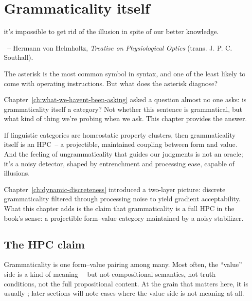 \chapter{Grammaticality itself}
\label{ch:grammaticality-itself}
\epigraph{it's impossible to get rid of the illusion in spite of our better knowledge.}{~-- Hermann von Helmholtz, \textit{Treatise on Physiological Optics} (trans. J. P. C. Southall).}

The asterisk is the most common symbol in syntax, and one of the least likely to come with operating instructions. But what does the asterisk diagnose?

Chapter~\ref{ch:what-we-havent-been-asking} asked a question almost no one asks: is grammaticality itself a category? Not whether this sentence is grammatical, but what kind of thing we're probing when we ask. This chapter provides the answer.

If linguistic categories are homeostatic property clusters, then grammaticality itself is an HPC~-- a projectible, maintained coupling between form and value. And the feeling of ungrammaticality that guides our judgments is not an oracle; it's a noisy detector, shaped by entrenchment and processing ease, capable of illusions.

Chapter~\ref{ch:dynamic-discreteness} introduced a two-layer picture: discrete grammaticality filtered through processing noise to yield gradient acceptability. What this chapter adds is the claim that grammaticality is a full HPC in the book's sense: a projectible form--value category maintained by a noisy stabilizer.


\section{The HPC claim}
\label{sec:14:hpc-claim}

Grammaticality is one form--value pairing among many. Most often, the \enquote{value} side is a kind of meaning~-- but not compositional semantics, not truth conditions, not the full propositional content. At the grain that matters here, it is usually ; later sections will note cases where the value side is not meaning at all.

